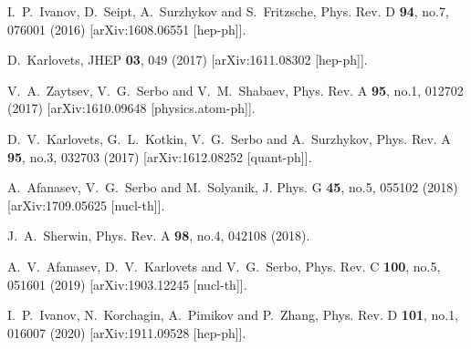 \documentclass[aps,prd,longbibliography,nofootinbib,amsthm,amsmath,amssymb,amsfonts,notitlepage]{revtex4-1}
\begin{document}
\begin{thebibliography}{99}
I.~P.~Ivanov, D.~Seipt, A.~Surzhykov and S.~Fritzsche,
Phys. Rev. D \textbf{94}, no.7, 076001 (2016)
[arXiv:1608.06551 [hep-ph]].

D.~Karlovets,
JHEP \textbf{03}, 049 (2017)
[arXiv:1611.08302 [hep-ph]].

V.~A.~Zaytsev, V.~G.~Serbo and V.~M.~Shabaev,
Phys. Rev. A \textbf{95}, no.1, 012702 (2017)
[arXiv:1610.09648 [physics.atom-ph]].

D.~V.~Karlovets, G.~L.~Kotkin, V.~G.~Serbo and A.~Surzhykov,
Phys. Rev. A \textbf{95}, no.3, 032703 (2017)
[arXiv:1612.08252 [quant-ph]].

A.~Afanasev, V.~G.~Serbo and M.~Solyanik,
J. Phys. G \textbf{45}, no.5, 055102 (2018)
[arXiv:1709.05625 [nucl-th]].

J.~A.~Sherwin,
Phys. Rev. A \textbf{98}, no.4, 042108 (2018).

A.~V.~Afanasev, D.~V.~Karlovets and V.~G.~Serbo,
Phys. Rev. C \textbf{100}, no.5, 051601 (2019)
[arXiv:1903.12245 [nucl-th]].

I.~P.~Ivanov, N.~Korchagin, A.~Pimikov and P.~Zhang,
Phys. Rev. D \textbf{101}, no.1, 016007 (2020)
[arXiv:1911.09528 [hep-ph]].


\end{thebibliography}
\end{document}
